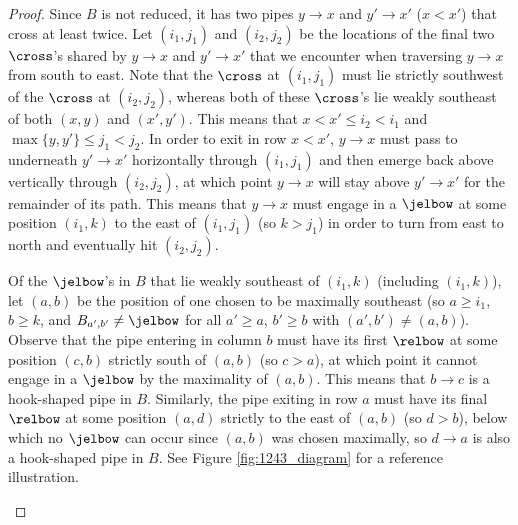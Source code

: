 \begin{proof}
    Since $B$ is not reduced, it has two pipes $y\to x$ and $y'\to x'$ ($x< x'$) that cross at least twice.
    Let $(i_1,j_1)$ and $(i_2,j_2)$ be the locations of the final two $\cross$'s shared by $y\to x$ and $y'\to x'$ that we encounter when traversing $y\to x$ from south to east.
    Note that the $\cross$ at $(i_1,j_1)$ must lie strictly southwest of the $\cross$ at $(i_2,j_2)$, whereas both of these $\cross$'s lie weakly southeast of both $(x,y)$ and $(x',y')$.
    This means that $x< x'\leq i_2<i_1$ and $\max\{y,y'\}\leq j_1<j_2$.
    In order to exit in row $x<x'$, $y\to x$ must pass to underneath $y'\to x'$ horizontally through $(i_1,j_1)$ and then emerge back above vertically through $(i_2,j_2)$, at which point $y\to x$ will stay above $y'\to x'$ for the remainder of its path.
    This means that $y\to x$ must engage in a $\jelbow$ at some position $(i_1,k)$ to the east of $(i_1,j_1)$ (so $k>j_1$) in order to turn from east to north and eventually hit $(i_2,j_2)$.
    
    Of the $\jelbow$'s in $B$ that lie weakly southeast of $(i_1,k)$ (including $(i_1,k)$), let $(a,b)$ be the position of one chosen to be maximally southeast (so $a\geq i_1$, $b\geq k$, and $B_{a',b'}\neq \jelbow$ for all $a'\geq a$, $b'\geq b$ with $(a',b')\neq (a,b)$).
    Observe that the pipe entering in column $b$ must have its first $\relbow$ at some position $(c,b)$ strictly south of $(a,b)$ (so $c>a$), at which point it cannot engage in a $\jelbow$ by the maximality of $(a,b)$.
    This means that $b\to c$ is a hook-shaped pipe in $B$.
    Similarly, the pipe exiting in row $a$ must have its final $\relbow$ at some position $(a,d)$ strictly to the east of $(a,b)$ (so $d>b$), below which no $\jelbow$ can occur since $(a,b)$ was chosen maximally, so $d\to a$ is also a hook-shaped pipe in $B$.
    See Figure \ref{fig:1243_diagram} for a reference illustration.
    
\begin{figure}
\end{figure}
\end{proof}
